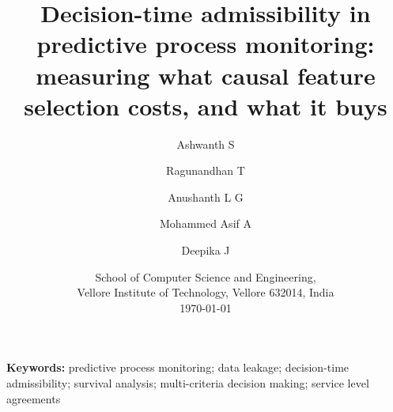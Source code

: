 \documentclass[11pt,a4paper]{article}
\title{\textbf{Decision-time admissibility in predictive process monitoring:\\
measuring what causal feature selection costs, and what it buys}}
\author{%
Ashwanth S \and
Ragunandhan T \and
Anushanth L G \and
Mohammed Asif A \and
Deepika J
}
\date{School of Computer Science and Engineering,\\
Vellore Institute of Technology, Vellore 632014, India\\[0.6em]
\today}
\begin{document}
\maketitle

\begin{abstract}
\noindent

\end{abstract}

\noindent\textbf{Keywords:} predictive process monitoring; data leakage; decision-time
admissibility; survival analysis; multi-criteria decision making; service level agreements






















\end{document}
